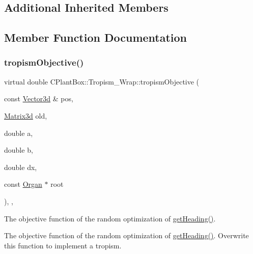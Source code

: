 \subsection*{Additional Inherited Members}


\subsection{Member Function Documentation}
\mbox{\label{classCPlantBox_1_1Tropism__Wrap_a00aba49f282f1013a15f9244c263be09}} 
\subsubsection{\texorpdfstring{tropism\+Objective()}{tropismObjective()}}
{\footnotesize\ttfamily virtual double C\+Plant\+Box\+::\+Tropism\+\_\+\+Wrap\+::tropism\+Objective (\begin{DoxyParamCaption}\item[{const \hyperlink{classCPlantBox_1_1Vector3d}{Vector3d} \&}]{pos,  }\item[{\hyperlink{classCPlantBox_1_1Matrix3d}{Matrix3d}}]{old,  }\item[{double}]{a,  }\item[{double}]{b,  }\item[{double}]{dx,  }\item[{const \hyperlink{classCPlantBox_1_1Organ}{Organ} $\ast$}]{root }\end{DoxyParamCaption})\hspace{0.3cm}{\ttfamily [inline]}, {\ttfamily [override]}, {\ttfamily [virtual]}}



The objective function of the random optimization of \hyperlink{classCPlantBox_1_1TropismFunction_adb52b88734a94fe1365a00e02c7e6be5}{get\+Heading()}. 

The objective function of the random optimization of \hyperlink{classCPlantBox_1_1TropismFunction_adb52b88734a94fe1365a00e02c7e6be5}{get\+Heading()}. Overwrite this function to implement a tropism.


